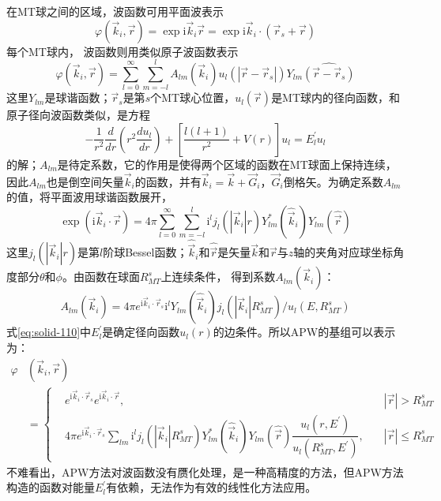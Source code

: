 在MT球之间的区域，波函数可用平面波表示
\begin{equation}
	\varphi(\vec k_i,\vec r)=\exp\mathrm{i}\vec k_i\vec r=\exp\mathrm{i}\vec k_i\cdot(\vec r_s+\vec r)
  \label{eq:solid-111}
\end{equation}
每个MT球内，%
波函数则用类似原子波函数表示
\begin{equation}
  \varphi(\vec k_i,\vec r)=\sum_{l=0}^{\infty}\sum_{m=-l}^lA_{lm}(\vec k_i)u_l(|\vec r-\vec r_s|)Y_{lm}\widehat{(\vec r-\vec r_s)}
  \label{eq:solid-109}
\end{equation}
这里$Y_{lm}$是球谐函数；$\vec r_s$是第$s$个MT球心位置，$u_l(\vec r)$是MT球内的径向函数，和原子径向波函数类似，是方程
\begin{equation}
  -\frac1{r^2}\frac d{dr}\left(r^2\frac{du_l}{dr}\right)+\left[\frac{l(l+1)}{r^2}+V(r)\right]u_l=E_l^{\prime}u_l
  \label{eq:solid-110}
\end{equation}
的解；$A_{lm}$是待定系数，它的作用是使得两个区域的函数在MT球面上保持连续，因此$A_{lm}$也是倒空间矢量$\vec k_i$的函数，并有$\vec k_i=\vec k+\vec G_i$，$\vec G_i$倒格矢。为确定系数$A_{lm}$的值，将平面波用球谐函数展开，
\begin{equation}
	\exp(\mathrm{i}\vec k_i\cdot\vec r)=4\pi\sum_{l=0}^{\infty}\sum_{m=-l}^l\mathrm{i}^lj_l(|\vec k_i|r)Y_{lm}^{\ast}(\hat{\vec k}_i)Y_{lm}(\hat{\vec r})
  \label{eq:solid-112}
\end{equation}
这里$j_l(|\vec k_i|r)$是第$l$阶球Bessel函数；$\hat{\vec k}_i$和$\hat{\vec r}$是矢量$\vec k$和$\vec r$与$z$轴的夹角对应球坐标角度部分$\theta$和$\phi$。由函数在球面$R_{MT}^s$上连续条件，%
得到系数$A_{lm}(\vec k_i)$：
$$A_{lm}(\vec k_i)=4\pi e^{\mathrm{i}\vec k_i\cdot\vec r_s}\mathrm{i}^lY_{lm}(\hat{\vec k}_i)j_l(|\vec k_i|R_{MT}^s)/u_l(E,R_{MT}^s)$$
式\eqref{eq:solid-110}中$E_l^{\prime}$是确定径向函数$u_l(r)$的边条件。所以APW的基组可以表示为：
\begin{equation}
  \begin{split}
    \varphi&(\vec k_i,\vec r)\\
    &=\left\{\begin{aligned}
	    &e^{\mathrm{i}\vec k_i\cdot\vec r_s}e^{\mathrm{i}\vec k_i\cdot\vec r},&|\vec r|>R_{MT}^s\\
	    &4\pi e^{\mathrm{i}\vec k_i\cdot\vec r_s}\sum_{lm}\mathrm{i}^lj_l(|\vec k_i|R_{MT}^s)Y_{lm}^{\ast}(\hat{\vec k}_i)Y_{lm}(\hat{\vec r})\dfrac{u_l(r,E^{\prime})}{u_l(R_{MT}^s,E^{\prime})},\quad&|\vec r|\leqslant R_{MT}^s
    \end{aligned} \right.
  \end{split}
  \label{eq:solid-113}
\end{equation}
不难看出，APW方法对波函数没有赝化处理，是一种高精度的方法，但APW方法构造的函数对能量$E_l^{\prime}$有依赖，无法作为有效的线性化方法应用。

